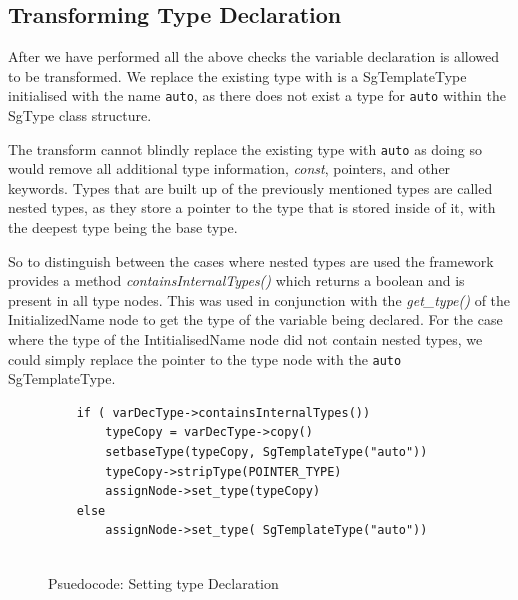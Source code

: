 \documentclass[bsc,frontabs,singlespacing,twoside,parskip,deptreport]{infthesis}
\begin{document}

\subsection{Transforming Type Declaration}
After we have performed all the above checks the variable declaration is allowed to be transformed. We replace the existing type with is a SgTemplateType initialised with the name \texttt{auto}, as there does not exist a type for \texttt{auto} within the SgType class structure. 

The transform cannot blindly replace the existing type with \texttt{auto} as doing so would remove all additional type information, \textit{const}, pointers, and other keywords. Types that are built up of the previously mentioned types are called nested types, as they store a pointer to the type that is stored inside of it, with the deepest type being the base type.

So to distinguish between the cases where nested types are used the framework provides a method \textit{containsInternalTypes()} which returns a boolean and is present in all type nodes. This was used in conjunction with the \textit{get\_type()} of the InitializedName node to get the type of the variable being declared. For the case where the type of the IntitialisedName node did not contain nested types, we could simply replace the pointer to the type node with the \texttt{auto} SgTemplateType. 

\begin{figure}[H]
    \centering
    \begin{verbatim}
    if ( varDecType->containsInternalTypes())
        typeCopy = varDecType->copy()
        setbaseType(typeCopy, SgTemplateType("auto"))
        typeCopy->stripType(POINTER_TYPE)
        assignNode->set_type(typeCopy)
    else
        assignNode->set_type( SgTemplateType("auto"))
    
    \end{verbatim}
    \caption{Psuedocode: Setting type Declaration}
    \label{fig:auto-cases-nested-types}
\end{figure}
\end{document}
